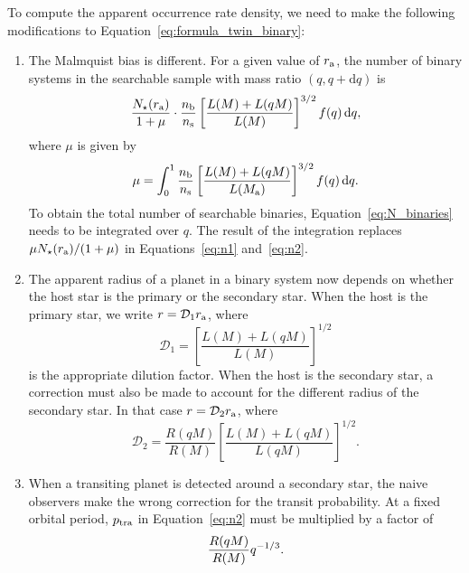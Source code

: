 \documentclass[12pt,modern]{aastex61}
\renewcommand{\a}{_{\rm a}}
\begin{document}
To compute the apparent occurrence rate density, we need to make
the following modifications to Equation~\ref{eq:formula_twin_binary}:
%
\begin{enumerate}
%
\item The Malmquist bias is different.  For a given value of $r\a$, the
  number of binary systems in the searchable sample with mass ratio
  $(q, q+\mathrm{d}q)$ is
\begin{equation}
    {N_\star(r\a)\over{1+\mu}}\cdot {n_{\rm b}\over n_{\rm s}}
    \left[{L(M) + L(qM) \over L(M)}\right]^{3/2}
    f(q)\,\mathrm{d}q,
    \label{eq:N_binaries}
\end{equation}
where $\mu$ is given by
\begin{equation}
    \mu= 
    \int_0^1 {n_{\rm b}\over n_{\rm s}}\left[{L(M) + L(qM)
    \over L(M\a)}\right]^{3/2} f(q)\,\mathrm{d}q.
    \label{eq:mu_general}
\end{equation}
To obtain the total number of searchable binaries,
Equation~\ref{eq:N_binaries} needs to be integrated over $q$. The
result of the integration replaces ${\mu N_\star(r\a)/(1+\mu)}$ in
Equations~\ref{eq:n1} and~\ref{eq:n2}.

\item The apparent radius of a planet in a binary system now depends
on whether the host star is the primary or the secondary star. When the host
is the primary star, we write $r=\mathcal{D}_1 r\a$, where
\begin{equation}
    \mathcal{D}_1
    = \left[ \frac{ L(M) + L(qM) }{ L(M) } \right]^{1/2}
    \label{eq:dil_1}
\end{equation}
is the appropriate dilution factor.
When the host is the secondary star, a correction must also be made
to account for the different radius of the secondary star.
In that case $r=\mathcal{D}_2 r\a$, where
\begin{equation}
  \mathcal{D}_2
  = \frac{R(qM)}{R(M)}
    \left[ \frac{L(M) + L(qM)}{L(qM)} \right]^{1/2}.
  \label{eq:dil_2}
\end{equation}

\item When a transiting planet is detected around a secondary star,
  the naive observers make the wrong correction for the transit
  probability.  At a fixed orbital period, $p_{\rm tra}$
  in Equation~\ref{eq:n2} must be multiplied by a factor of
\begin{equation}
  {R(qM) \over R(M)}q^{-1/3}.
\end{equation}

\end{enumerate}
\end{document}
